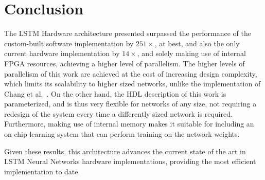 \documentclass{IEEEtran}
\begin{document}
\section{Conclusion}\label{sec:concl}
The LSTM Hardware architecture presented surpassed the performance of the custom-built software implementation by $251\times$, at best,
and also the only current hardware implementation by $14\times$, and solely making use of internal FPGA
resources, achieving a higher level of parallelism. The higher levels of parallelism of this work are achieved at the cost of increasing
design complexity, which limits its scalability to higher sized networks, unlike the implementation of Chang et al.~\cite{Chang15}.
On the other hand, the HDL description of this work is parameterized, and is thus very flexible for networks of any size, not requiring
a redesign of the system every time a differently sized network is required. Furthermore, making use of internal memory makes it suitable
for including an on-chip learning system that can perform training on the network weights.

Given these results, this architecture advances the current state of the art in LSTM Neural Networks
hardware implementations, providing the most efficient implementation to date.



\end{document}
